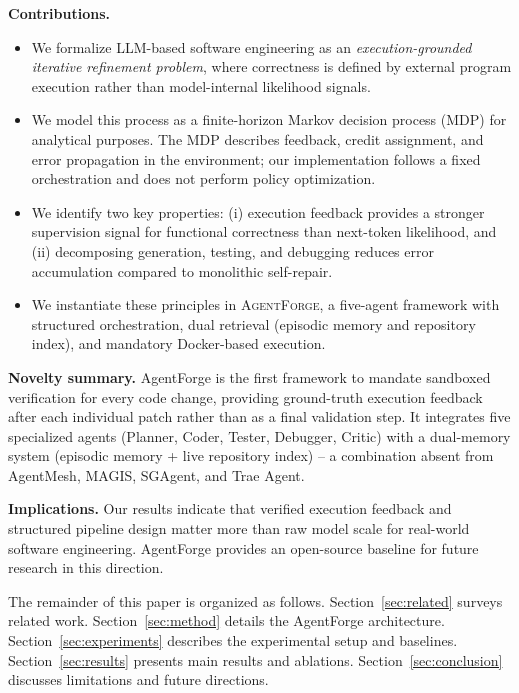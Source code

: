\documentclass[journal]{IEEEtran}
\newcommand{\agentforge}{\textsc{AgentForge}}
\begin{document}
\textbf{Contributions.}
\begin{itemize}
    \item We formalize LLM-based software engineering as an \textit{execution-grounded iterative refinement problem}, where correctness is defined by external program execution rather than model-internal likelihood signals.

    \item We model this process as a finite-horizon Markov decision process (MDP) for analytical purposes. The MDP describes feedback, credit assignment, and error propagation in the environment; our implementation follows a fixed orchestration and does not perform policy optimization.

    \item We identify two key properties: (i) execution feedback provides a stronger supervision signal for functional correctness than next-token likelihood, and (ii) decomposing generation, testing, and debugging reduces error accumulation compared to monolithic self-repair.

    \item We instantiate these principles in \agentforge{}, a five-agent framework with structured orchestration, dual retrieval (episodic memory and repository index), and mandatory Docker-based execution.

\end{itemize}

\textbf{Novelty summary.} AgentForge is the first framework to mandate sandboxed verification for every code change, providing ground-truth execution feedback after each individual patch rather than as a final validation step. It integrates five specialized agents (Planner, Coder, Tester, Debugger, Critic) with a dual-memory system (episodic memory + live repository index) -- a combination absent from AgentMesh, MAGIS, SGAgent, and Trae Agent.

\textbf{Implications.} Our results indicate that verified execution feedback and structured pipeline design matter more than raw model scale for real-world software engineering. AgentForge provides an open-source baseline for future research in this direction.

The remainder of this paper is organized as follows. Section~\ref{sec:related} surveys related work. Section~\ref{sec:method} details the AgentForge architecture. Section~\ref{sec:experiments} describes the experimental setup and baselines. Section~\ref{sec:results} presents main results and ablations. Section~\ref{sec:conclusion} discusses limitations and future directions.
\end{document}
